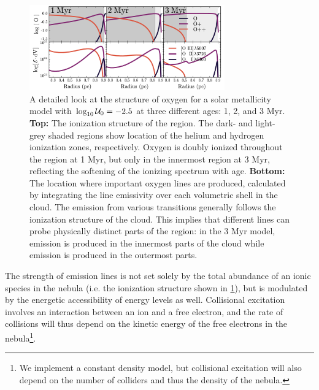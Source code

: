 \begin{figure}[!htbp]
  \begin{centering}
    \includegraphics[width=0.75\textwidth]{manuscript/chapter2/f7.pdf}
    \caption{A detailed look at the structure of oxygen for a solar metallicity model with $\log_{10} \mathcal{U}_0 = -2.5$ at three different ages: 1, 2, and 3 Myr. \textbf{Top:} The ionization structure of the \hii region. The dark- and light-grey shaded regions show location of the helium and hydrogen ionization zones, respectively. Oxygen is doubly ionized throughout the \hii region at 1 Myr, but only in the innermost region at 3 Myr, reflecting the softening of the ionizing spectrum with age. \textbf{Bottom:} The location where important oxygen lines are produced, calculated by integrating the line emissivity over each volumetric shell in the cloud. The emission from various transitions generally follows the ionization structure of the cloud. This implies that different lines can probe physically distinct parts of the \hii region: in the 3 Myr model, \oiii{} emission is produced in the innermost parts of the cloud while \oi{} emission is produced in the outermost parts.}
    \label{fig:ionEmisAge}
  \end{centering}
\end{figure}

The strength of emission lines is not set solely by the total abundance of an ionic species in the nebula (i.e. the ionization structure shown in \ref{fig:ionEmisAge}), but is modulated by the energetic accessibility of energy levels as well. Collisional excitation involves an interaction between an ion and a free electron, and the rate of collisions will thus depend on the kinetic energy of the free electrons in the nebula\footnote{We implement a constant density model, but collisional excitation will also depend on the number of colliders and thus the density of the nebula.}.

